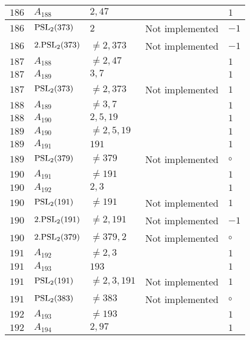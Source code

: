\documentclass[a4paper, 11pt]{article}
\begin{document}
\begin{longtable}{lllll}
        $ 186 $ & $ A_{188} $ & $ 2, 47 $ & $ ~ $ & $ 1  $ \\ \hline
        $ 186 $ & $ {\rm PSL}_{2}(373) $ & $ 2 $ & Not implemented & $ -1  $ \\ \hline
        $ 186 $ & $ 2.{\rm PSL}_{2}(373) $ & $ \neq 2, 373 $ & Not implemented & $ -1  $ \\ \hline
        $ 187 $ & $ A_{188} $ & $ \neq 2, 47 $ & $ ~ $ & $ 1  $ \\ \hline
        $ 187 $ & $ A_{189} $ & $ 3, 7 $ & $ ~ $ & $ 1  $ \\ \hline
        $ 187 $ & $ {\rm PSL}_{2}(373) $ & $ \neq 2, 373 $ & Not implemented & $ 1  $ \\ \hline
        $ 188 $ & $ A_{189} $ & $ \neq 3, 7 $ & $ ~ $ & $ 1  $ \\ \hline
        $ 188 $ & $ A_{190} $ & $ 2, 5, 19 $ & $ ~ $ & $ 1  $ \\ \hline
        $ 189 $ & $ A_{190} $ & $ \neq 2, 5, 19 $ & $ ~ $ & $ 1  $ \\ \hline
        $ 189 $ & $ A_{191} $ & $ 191 $ & $ ~ $ & $ 1  $ \\ \hline
        $ 189 $ & $ {\rm PSL}_{2}(379) $ & $ \neq 379 $ & Not implemented & $\circ$ \\ \hline
        $ 190 $ & $ A_{191} $ & $ \neq 191 $ & $ ~ $ & $ 1  $ \\ \hline
        $ 190 $ & $ A_{192} $ & $ 2, 3 $ & $ ~ $ & $ 1  $ \\ \hline
        $ 190 $ & $ {\rm PSL}_{2}(191) $ & $ \neq 191 $ & Not implemented & $ 1  $ \\ \hline
        $ 190 $ & $ 2.{\rm PSL}_{2}(191) $ & $ \neq 2, 191 $ & Not implemented & $ -1  $ \\ \hline
        $ 190 $ & $ 2.{\rm PSL}_{2}(379) $ & $ \neq 379, 2 $ & Not implemented & $\circ$ \\ \hline
        $ 191 $ & $ A_{192} $ & $ \neq 2, 3 $ & $ ~ $ & $ 1  $ \\ \hline
        $ 191 $ & $ A_{193} $ & $ 193 $ & $ ~ $ & $ 1  $ \\ \hline
        $ 191 $ & $ {\rm PSL}_{2}(191) $ & $ \neq 2, 3, 191 $ & Not implemented & $ 1  $ \\ \hline
        $ 191 $ & $ {\rm PSL}_{2}(383) $ & $ \neq 383 $ & Not implemented & $\circ$ \\ \hline
        $ 192 $ & $ A_{193} $ & $ \neq 193 $ & $ ~ $ & $ 1  $ \\ \hline
        $ 192 $ & $ A_{194} $ & $ 2, 97 $ & $ ~ $ & $ 1  $ \\ \hline

\end{longtable}
\end{document}
